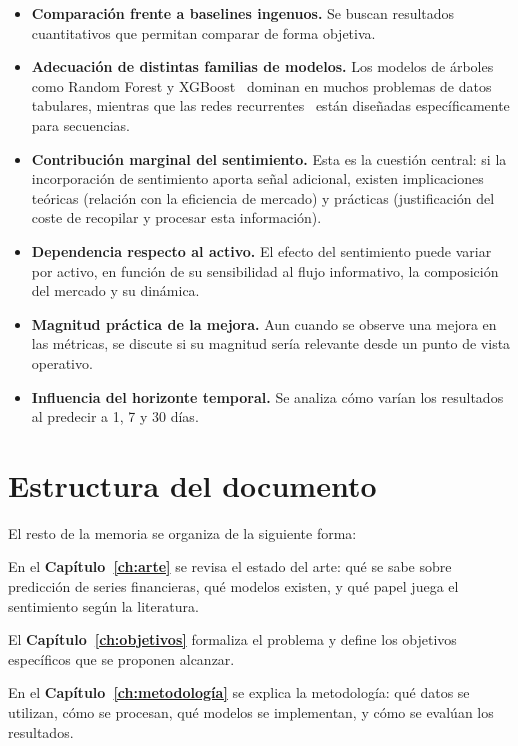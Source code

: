 \begin{itemize}
    \item \textbf{Comparación frente a baselines ingenuos.} Se buscan resultados cuantitativos que permitan comparar de forma objetiva.
    
    \item \textbf{Adecuación de distintas familias de modelos.} Los modelos de árboles como Random Forest y XGBoost~\cite{chen2016xgboost} dominan en muchos problemas de datos tabulares, mientras que las redes recurrentes~\cite{hochreiter1997long} están diseñadas específicamente para secuencias.
    
    \item \textbf{Contribución marginal del sentimiento.} Esta es la cuestión central: si la incorporación de sentimiento aporta señal adicional, existen implicaciones teóricas (relación con la eficiencia de mercado) y prácticas (justificación del coste de recopilar y procesar esta información).
    
    \item \textbf{Dependencia respecto al activo.} El efecto del sentimiento puede variar por activo, en función de su sensibilidad al flujo informativo, la composición del mercado y su dinámica.
    
    \item \textbf{Magnitud práctica de la mejora.} Aun cuando se observe una mejora en las métricas, se discute si su magnitud sería relevante desde un punto de vista operativo.
    
    \item \textbf{Influencia del horizonte temporal.} Se analiza cómo varían los resultados al predecir a 1, 7 y 30 días.
\end{itemize}

\section{Estructura del documento}

El resto de la memoria se organiza de la siguiente forma:

En el \textbf{Capítulo~\ref{ch:arte}} se revisa el estado del arte: qué se sabe sobre predicción de series financieras, qué modelos existen, y qué papel juega el sentimiento según la literatura.

El \textbf{Capítulo~\ref{ch:objetivos}} formaliza el problema y define los objetivos específicos que se proponen alcanzar.

En el \textbf{Capítulo~\ref{ch:metodología}} se explica la metodología: qué datos se utilizan, cómo se procesan, qué modelos se implementan, y cómo se evalúan los resultados.


